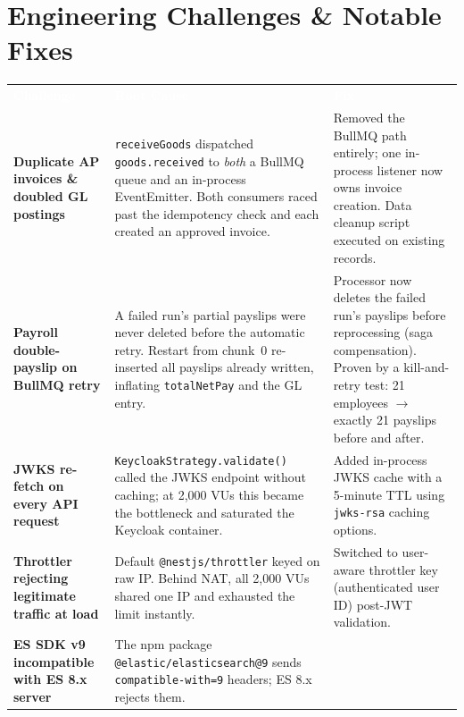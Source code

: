 \documentclass[11pt,a4paper]{article}
\newcommand{\code}[1]{\texttt{\small #1}}
\begin{document}
\section{Engineering Challenges \& Notable Fixes}\label{sec:challenges}

\begin{table}[H]
\centering\small
\renewcommand{\arraystretch}{1.4}
\begin{tabularx}{\textwidth}{>{\raggedright\arraybackslash}p{3.1cm} X X}
\toprule
\rowcolor{amdoxnavy}
\textcolor{white}{\textbf{Challenge}} &
\textcolor{white}{\textbf{Root Cause}} &
\textcolor{white}{\textbf{Fix}} \\
%
\textbf{Duplicate AP invoices \& doubled GL postings} &
  \code{receiveGoods} dispatched \code{goods.received} to \emph{both} a BullMQ
  queue and an in-process EventEmitter. Both consumers raced past the idempotency
  check and each created an approved invoice. &
  Removed the BullMQ path entirely; one in-process listener now owns
  invoice creation. Data cleanup script executed on existing records. \\
\rowcolor{amdoxlight}
%
\textbf{Payroll double-payslip on BullMQ retry} &
  A failed run's partial payslips were never deleted before the automatic
  retry. Restart from chunk~0 re-inserted all payslips already written,
  inflating \code{totalNetPay} and the GL entry. &
  Processor now deletes the failed run's payslips before reprocessing
  (saga compensation). Proven by a kill-and-retry test:
  21 employees $\rightarrow$ exactly 21 payslips before and after. \\
%
\textbf{JWKS re-fetch on every API request} &
  \code{KeycloakStrategy.validate()} called the JWKS endpoint without
  caching; at 2{,}000 VUs this became the bottleneck and saturated
  the Keycloak container. &
  Added in-process JWKS cache with a 5-minute TTL using
  \code{jwks-rsa} caching options. \\
\rowcolor{amdoxlight}
%
\textbf{Throttler rejecting legitimate traffic at load} &
  Default \code{@nestjs/throttler} keyed on raw IP. Behind NAT, all
  2{,}000 VUs shared one IP and exhausted the limit instantly. &
  Switched to user-aware throttler key (authenticated user ID)
  post-JWT validation. \\
%
\textbf{ES SDK v9 incompatible with ES 8.x server} &
  The npm package \code{@elastic/elasticsearch@9} sends
  \code{compatible-with=9} headers; ES 8.x rejects them. &

\end{tabularx}
\end{table}
\end{document}
